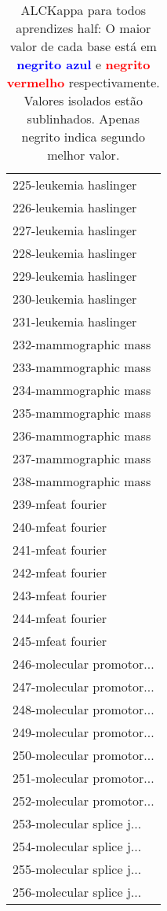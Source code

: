 \begin{table}[h]
\caption{ALCKappa para todos aprendizes half: O maior valor de cada base está em \textcolor{blue}{\textbf{negrito azul}} e \textcolor{red}{\textbf{negrito vermelho}} respectivamente. Valores isolados estão sublinhados. Apenas negrito indica segundo melhor valor.}
\begin{center}\begin{tabular}{l}
 & \\ \hline 225-leukemia haslinger &  \\
226-leukemia haslinger &  \\
227-leukemia haslinger &  \\
228-leukemia haslinger &  \\
229-leukemia haslinger &  \\
230-leukemia haslinger &  \\
231-leukemia haslinger &  \\ \hline
232-mammographic mass &  \\
233-mammographic mass &  \\
234-mammographic mass &  \\
235-mammographic mass &  \\
236-mammographic mass &  \\
237-mammographic mass &  \\
238-mammographic mass &  \\ \hline
239-mfeat fourier &  \\
240-mfeat fourier &  \\
241-mfeat fourier &  \\
242-mfeat fourier &  \\
243-mfeat fourier &  \\
244-mfeat fourier &  \\
245-mfeat fourier &  \\ \hline
246-molecular promotor... &  \\
247-molecular promotor... &  \\
248-molecular promotor... &  \\
249-molecular promotor... &  \\
250-molecular promotor... &  \\
251-molecular promotor... &  \\
252-molecular promotor... &  \\ \hline
253-molecular splice j... &  \\
254-molecular splice j... &  \\
255-molecular splice j... &  \\
256-molecular splice j... &  \\\end{tabular}\label{stratsALCKappa7AllReduxb}
\end{center}
\end{table}
